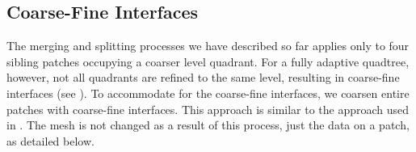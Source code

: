 \subsection{Coarse-Fine Interfaces}
\label{sub:mesh_adaptivity}

The merging and splitting processes we have described so far applies only to four sibling patches occupying a coarser level quadrant. For a fully adaptive quadtree, however, not all quadrants are refined to the same level, resulting in coarse-fine interfaces (see ). To accommodate for the coarse-fine interfaces, we coarsen entire patches with coarse-fine interfaces. This approach is similar to the approach used in \cite{babb2018accelerated}. The mesh is not changed as a result of this process, just the data on a patch, as detailed below.

